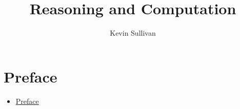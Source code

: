 \documentclass{book}
\title{Reasoning and Computation}
\author{Kevin Sullivan}
\providecommand{\tightlist}{%
  \setlength{\itemsep}{0pt}\setlength{\parskip}{0pt}}
\begin{document}
\maketitle
\newpage

\tableofcontents
\newpage

\hypertarget{pandoc.profile.debug__pandoc__debug__src__preface.md}{}
\hypertarget{pandoc.profile.debug__pandoc__debug__src__preface.md__preface}{%
\chapter*{Preface}\label{pandoc.profile.debug__pandoc__debug__src__preface.md__preface}}

\begin{itemize}
\tightlist
\item
  \protect\hyperlink{pandoc.profile.debug__pandoc__debug__src__preface.md__preface}{Preface}


\end{itemize}
\end{document}
